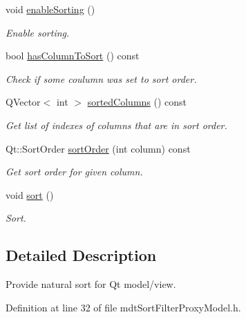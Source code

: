 \begin{DoxyCompactItemize}
void \hyperlink{classmdt_sort_filter_proxy_model_ad241f4666aa20dd45e952196d41611d8}{enable\-Sorting} ()
\begin{DoxyCompactList}\small\item\em Enable sorting. \end{DoxyCompactList}\item 
bool \hyperlink{classmdt_sort_filter_proxy_model_a2dcbaa1d5ffb38368a87e6b4834053f1}{has\-Column\-To\-Sort} () const 
\begin{DoxyCompactList}\small\item\em Check if some coulumn was set to sort order. \end{DoxyCompactList}\item 
Q\-Vector$<$ int $>$ \hyperlink{classmdt_sort_filter_proxy_model_a1a4d9fcee3a6817ae668c07ca2ec472f}{sorted\-Columns} () const 
\begin{DoxyCompactList}\small\item\em Get list of indexes of columns that are in sort order. \end{DoxyCompactList}\item 
Qt\-::\-Sort\-Order \hyperlink{classmdt_sort_filter_proxy_model_a506fff2a1f483ff67989c64b2c4e3491}{sort\-Order} (int column) const 
\begin{DoxyCompactList}\small\item\em Get sort order for given column. \end{DoxyCompactList}\item 
void \hyperlink{classmdt_sort_filter_proxy_model_a45e0d00b0e1a6918d9eae5d276a9614c}{sort} ()
\begin{DoxyCompactList}\small\item\em Sort. \end{DoxyCompactList}\end{DoxyCompactItemize}


\subsection{Detailed Description}
Provide natural sort for Qt model/view. 

Definition at line 32 of file mdt\-Sort\-Filter\-Proxy\-Model.\-h.



